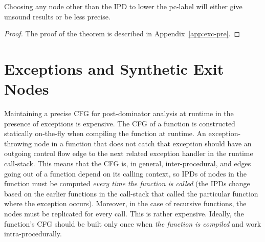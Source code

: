 \begin{myThm}[Precision]\label{thm1:exc}
Choosing any node other than the IPD to lower the pc-label will either
give unsound results or be less precise.
\end{myThm}
\begin{proof}
The proof of the theorem is described in Appendix~\ref{app:exc-pre}.
\end{proof}

\section{Exceptions and Synthetic Exit Nodes}
\label{sec:excsen}
Maintaining a precise CFG for post-dominator analysis at runtime in the 
presence of exceptions is expensive. The CFG of a function is 
constructed statically on-the-fly when compiling the function at 
runtime. An exception-throwing node in a
function that does not catch that exception should have an outgoing
control flow edge to the next related exception handler in the runtime
call-stack. This means that the CFG is, in general, inter-procedural,
and edges going out of a function depend on its calling context, so
IPDs of nodes in the function must be computed \emph{every time the
  function is called} (the IPDs change based on the earlier functions
in the call-stack that called the particular function where the
exception occurs). Moreover, in the case of recursive functions, the
nodes must be replicated for every call. This is rather
expensive. Ideally, the function's CFG should be built only once when
\emph{the function is compiled} and work intra-procedurally. 

